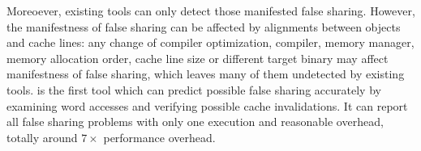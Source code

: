 Moreoever, existing tools can only detect those manifested false sharing.
However, the manifestness of false sharing can be affected by alignments between
objects and cache lines: any change of compiler optimization, compiler, memory manager, 
memory allocation order, cache line size or different target binary 
may affect manifestness of false sharing, 
which leaves many of them undetected by existing tools.
\Defaults{} is the first tool which can predict possible false sharing 
accurately by examining word accesses and verifying possible cache invalidations.   
It can report all false sharing problems with only one execution and reasonable overhead, totally 
around $7\times$ performance overhead.

